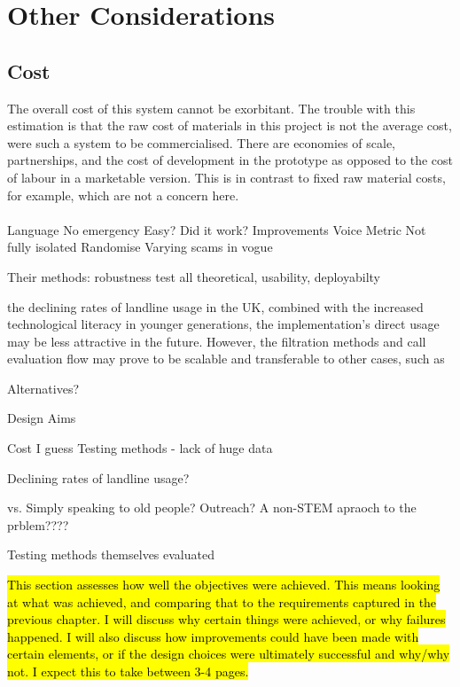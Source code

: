 \documentclass[main.tex]{subfiles}
\begin{document}
\section{Other Considerations}

\subsection{Cost}
The overall cost of this system cannot be exorbitant. The trouble with this estimation is that the raw cost of materials in this project is not the average cost, were such a system to be commercialised. There are economies of scale, partnerships, and the cost of development in the prototype as opposed to the cost of labour in a marketable version. This is in contrast to fixed raw material costs, for example, which are not a concern here.
\\\\
Language
No emergency
Easy?
Did it work?
Improvements
Voice Metric
Not fully isolated
Randomise
Varying scams in vogue

Their methods: robustness test all theoretical, usability, deployabilty

the declining rates of landline usage in the UK, combined with the increased technological literacy in younger generations, the implementation’s direct usage may be less attractive in the future. However, the filtration methods and call evaluation flow may prove to be scalable and transferable to other cases, such as

Alternatives?

Design Aims

Cost I guess
Testing methods - lack of huge data

Declining rates of landline usage?

vs. Simply speaking to old people? Outreach? A non-STEM apraoch to the prblem????


Testing methods themselves evaluated

\hl{This section assesses how well the objectives were achieved. This means looking at what was achieved, and comparing that to the requirements captured in the previous chapter. I will discuss why certain things were achieved, or why failures happened. I will also discuss how improvements could have been made with certain elements, or if the design choices were ultimately successful and why/why not. I expect this to take between 3-4 pages.}
\end{document}
